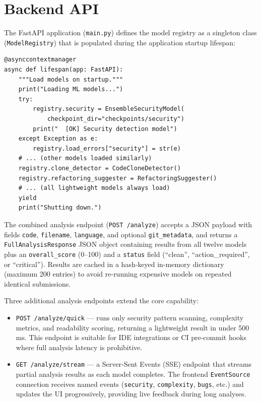 \documentclass[12pt, oneside]{report}
\begin{document}
\section{Backend API}
\label{sec:api}

The FastAPI application (\texttt{main.py}) defines the model registry as a singleton
class (\texttt{ModelRegistry}) that is populated during the application startup lifespan:

\begin{lstlisting}[caption={FastAPI lifespan: loading ML models at startup},
                   label={lst:lifespan}, style=pythonstyle]
@asynccontextmanager
async def lifespan(app: FastAPI):
    """Load models on startup."""
    print("Loading ML models...")
    try:
        registry.security = EnsembleSecurityModel(
            checkpoint_dir="checkpoints/security")
        print("  [OK] Security detection model")
    except Exception as e:
        registry.load_errors["security"] = str(e)
    # ... (other models loaded similarly)
    registry.clone_detector = CodeCloneDetector()
    registry.refactoring_suggester = RefactoringSuggester()
    # ... (all lightweight models always load)
    yield
    print("Shutting down.")
\end{lstlisting}

The combined analysis endpoint (\texttt{POST /analyze}) accepts a JSON payload with fields
\texttt{code}, \texttt{filename}, \texttt{language}, and optional \texttt{git\_metadata},
and returns a \texttt{FullAnalysisResponse} JSON object containing results from all twelve
models plus an \texttt{overall\_score} (0--100) and a \texttt{status} field (``clean'',
``action\_required'', or ``critical''). Results are cached in a hash-keyed in-memory
dictionary (maximum 200 entries) to avoid re-running expensive models on repeated
identical submissions.

Three additional analysis endpoints extend the core capability:

\begin{itemize}
  \item \texttt{POST /analyze/quick} — runs only security pattern scanning, complexity
    metrics, and readability scoring, returning a lightweight result in under 500\,ms.
    This endpoint is suitable for IDE integrations or CI pre-commit hooks where full
    analysis latency is prohibitive.
  \item \texttt{GET /analyze/stream} — a Server-Sent Events (SSE) endpoint that streams
    partial analysis results as each model completes. The frontend \texttt{EventSource}
    connection receives named events (\texttt{security}, \texttt{complexity}, \texttt{bugs},
    etc.) and updates the UI progressively, providing live feedback during long analyses.
\end{itemize}
\end{document}
